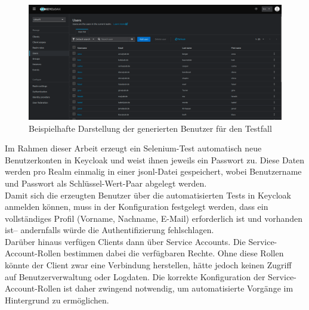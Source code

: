 \documentclass[a4paper,12pt]{article}
\begin{document}
	\begin{figure}[H]
		\centering
		\includegraphics[scale=1.5, width=\linewidth]{Bilder/screenshot011}
		\caption{Beispielhafte Darstellung der generierten Benutzer für den Testfall}
		\label{fig:screenshot011}
	\end{figure}
	
	Im Rahmen dieser Arbeit erzeugt ein Selenium-Test automatisch neue Benutzerkonten in Keycloak und weist ihnen jeweils ein Passwort zu. Diese Daten werden pro Realm einmalig in einer \gls{jsonl}-Datei gespeichert, wobei Benutzername und Passwort als Schlüssel-Wert-Paar abgelegt werden.
	\\[0.5em]
	Damit sich die erzeugten Benutzer über die automatisierten Tests in Keycloak anmelden können, muss in der Konfiguration festgelegt werden, dass ein vollständiges Profil (Vorname, Nachname, E-Mail) erforderlich ist und vorhanden ist– andernfalls würde die Authentifizierung fehlschlagen.
	\\[0.5em]
	Darüber hinaus verfügen Clients dann über Service Accounts. Die Service-Account-Rollen bestimmen dabei die verfügbaren Rechte. Ohne diese Rollen könnte der Client zwar eine Verbindung herstellen, hätte jedoch keinen Zugriff auf Benutzerverwaltung oder Logdaten. Die korrekte Konfiguration der Service-Account-Rollen ist daher zwingend notwendig, um automatisierte Vorgänge im Hintergrund zu ermöglichen.
	
\end{document}
